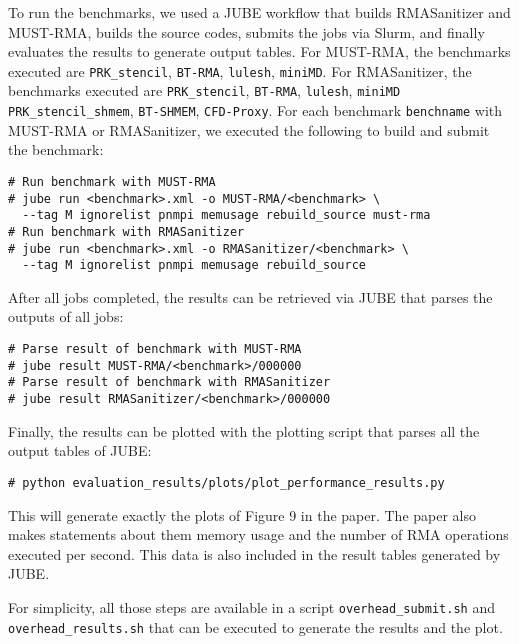 \documentclass[twoside]{article}
\begin{document}
To run the benchmarks, we used a JUBE workflow that builds RMASanitizer and MUST-RMA, builds the source codes, submits the jobs via Slurm, and finally evaluates the results to generate output tables.
For MUST-RMA, the benchmarks executed are \texttt{PRK\_stencil}, \texttt{BT-RMA}, \texttt{lulesh}, \texttt{miniMD}.
For RMASanitizer, the benchmarks executed are \texttt{PRK\_stencil}, \texttt{BT-RMA},  \texttt{lulesh}, \texttt{miniMD} \texttt{PRK\_stencil\_shmem}, \texttt{BT-SHMEM}, \texttt{CFD-Proxy}.
For each benchmark \texttt{benchname} with MUST-RMA or RMASanitizer, we executed the following to build and submit the benchmark:

{
\small
\begin{verbatim}
# Run benchmark with MUST-RMA
# jube run <benchmark>.xml -o MUST-RMA/<benchmark> \
  --tag M ignorelist pnmpi memusage rebuild_source must-rma
# Run benchmark with RMASanitizer
# jube run <benchmark>.xml -o RMASanitizer/<benchmark> \
  --tag M ignorelist pnmpi memusage rebuild_source
\end{verbatim}
}

After all jobs completed, the results can be retrieved via JUBE that parses the outputs of all jobs:

{
\small
\begin{verbatim}
# Parse result of benchmark with MUST-RMA
# jube result MUST-RMA/<benchmark>/000000
# Parse result of benchmark with RMASanitizer
# jube result RMASanitizer/<benchmark>/000000
\end{verbatim}
}

Finally, the results can be plotted with the plotting script that parses all the output tables of JUBE:
{
\small
\begin{verbatim}
# python evaluation_results/plots/plot_performance_results.py
\end{verbatim}
}

This will generate exactly the plots of Figure 9 in the paper. The paper also makes statements about them memory usage and the number of RMA operations executed per second. This data is also included in the result tables generated by JUBE.

For simplicity, all those steps are available in a script \texttt{overhead\_submit.sh} and \texttt{overhead\_results.sh} that can be executed to generate the results and the plot.
\end{document}
